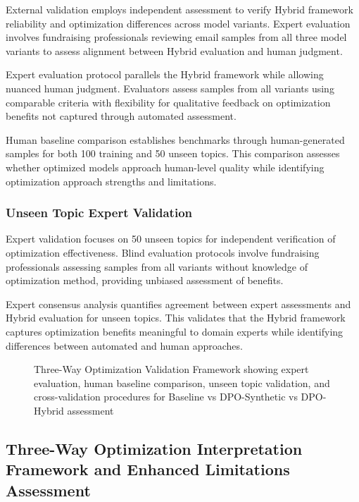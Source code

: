 External validation employs independent assessment to verify Hybrid framework reliability and optimization differences across model variants. Expert evaluation involves fundraising professionals reviewing email samples from all three model variants to assess alignment between Hybrid evaluation and human judgment.

Expert evaluation protocol parallels the Hybrid framework while allowing nuanced human judgment. Evaluators assess samples from all variants using comparable criteria with flexibility for qualitative feedback on optimization benefits not captured through automated assessment.

Human baseline comparison establishes benchmarks through human-generated samples for both 100 training and 50 unseen topics. This comparison assesses whether optimized models approach human-level quality while identifying optimization approach strengths and limitations.

\subsubsection{Unseen Topic Expert Validation}

Expert validation focuses on 50 unseen topics for independent verification of optimization effectiveness. Blind evaluation protocols involve fundraising professionals assessing samples from all variants without knowledge of optimization method, providing unbiased assessment of benefits.

Expert consensus analysis quantifies agreement between expert assessments and Hybrid evaluation for unseen topics. This validates that the Hybrid framework captures optimization benefits meaningful to domain experts while identifying differences between automated and human approaches.

\begin{figure}[htbp]
    \centering
    \caption{Three-Way Optimization Validation Framework showing expert evaluation, human baseline comparison, unseen topic validation, and cross-validation procedures for Baseline vs DPO-Synthetic vs DPO-Hybrid assessment}
    \label{fig:validation-framework}
\end{figure}

\subsection{Three-Way Optimization Interpretation Framework and Enhanced Limitations Assessment}

